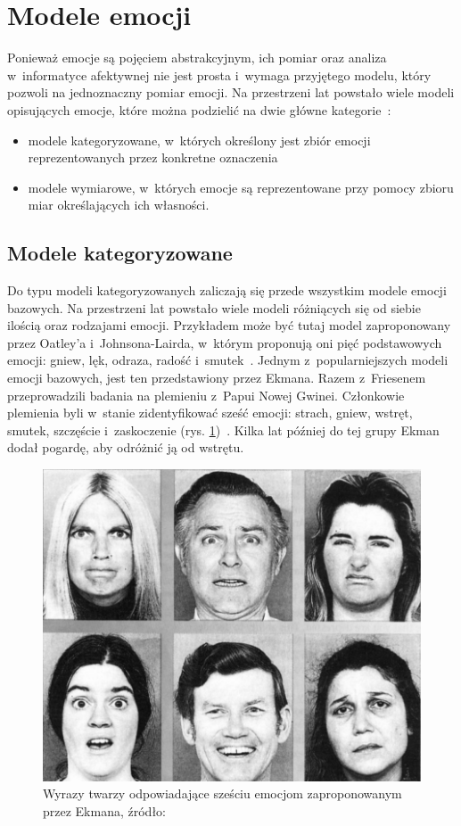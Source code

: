 \section{Modele emocji}
Ponieważ emocje są pojęciem abstrakcyjnym, ich pomiar oraz analiza w~informatyce afektywnej nie jest prosta i~wymaga przyjętego modelu, który pozwoli na jednoznaczny pomiar emocji. Na przestrzeni lat powstało wiele modeli opisujących emocje, które można podzielić na dwie główne kategorie~\cite{emotion_models_review_2017}:
\begin{itemize}
	\item modele kategoryzowane, w~których określony jest zbiór emocji reprezentowanych przez konkretne oznaczenia
	\item modele wymiarowe, w~których emocje są reprezentowane przy pomocy zbioru miar określających ich własności.
\end{itemize}

\subsection{Modele kategoryzowane}
Do typu modeli kategoryzowanych zaliczają się przede wszystkim modele emocji bazowych. Na przestrzeni lat powstało wiele modeli różniących się od siebie ilością oraz rodzajami emocji. Przykładem może być tutaj model zaproponowany przez Oatley'a i~Johnsona-Lairda, w~którym proponują oni pięć podstawowych emocji: gniew, lęk, odraza, radość i~smutek~\cite{oatley_theory_of_emotions}. Jednym z~popularniejszych modeli emocji bazowych, jest ten przedstawiony przez Ekmana. Razem z~Friesenem przeprowadzili badania na plemieniu z~Papui Nowej Gwinei. Członkowie plemienia byli w~stanie zidentyfikować sześć emocji: strach, gniew, wstręt, smutek, szczęście i~zaskoczenie (rys. \ref{fig:ekman_six_emotions})~\cite{Ekman1971ConstantsAC}. Kilka lat później do tej grupy Ekman dodał pogardę, aby odróżnić ją od wstrętu. 
\begin{figure}[h]
	\centering
	\includegraphics[width=0.6\linewidth]{images/ekman_six_basic_emotions.png}
	\caption{Wyrazy twarzy odpowiadające sześciu emocjom zaproponowanym przez Ekmana, źródło: \cite{Ekman1971ConstantsAC}}
	\label{fig:ekman_six_emotions}
\end{figure}

